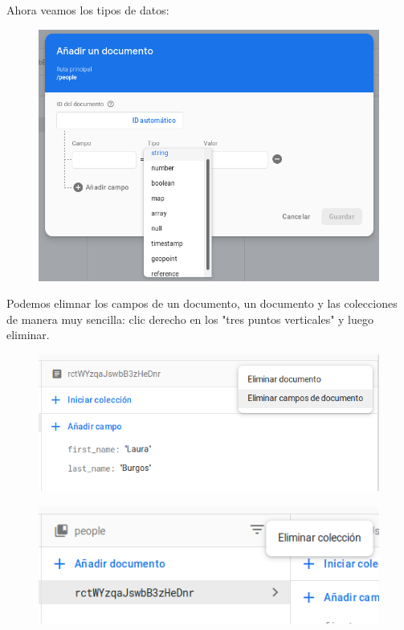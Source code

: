 \documentclass{article}
\begin{document}
Ahora veamos los tipos de datos:

\begin{figure}[h!]
  \centering
  \includegraphics[scale=0.75]{./Pictures/173_tipo_datos.png}
\end{figure}

Podemos elimnar los campos de un documento, un documento y las colecciones de
manera muy sencilla: clic derecho en los "tres puntos verticales" y luego
eliminar.

\newpage

\begin{figure}[h!]
  \centering
  \includegraphics[scale=0.75]{./Pictures/174_eliminar_documento.png}
\end{figure}

\begin{figure}[h!]
  \centering
  \includegraphics[scale=0.75]{./Pictures/175_eliminar_coleccion.png}
\end{figure}
\end{document}
